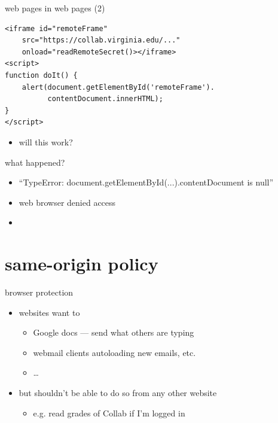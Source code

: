 \begin{frame}[fragile,label=webInWebOther]{web pages in web pages (2)}
    \vspace{-.25cm}
    \setlength{\parskip}{-0.5\baselineskip}
\begin{verbatim}
<iframe id="remoteFrame"
    src="https://collab.virginia.edu/..."
    onload="readRemoteSecret()></iframe>
<script>
function doIt() {
    alert(document.getElementById('remoteFrame').
          contentDocument.innerHTML);
}
</script>
\end{verbatim}
    \begin{itemize}
    \vspace{-.25cm}
    \item will this work?
    \end{itemize}
\end{frame}

\begin{frame}{what happened?}
    \begin{itemize}
        \item ``TypeError: document.getElementById(...).contentDocument is null''
        \item web browser denied access
        \vspace{.5cm}
    \item {}
    \end{itemize}
\end{frame}


\section{same-origin policy}

\begin{frame}{browser protection}
    \begin{itemize}
        \item websites want to 
    \begin{itemize}
        \item Google docs --- send what others are typing
        \item webmail clients autoloading new emails, etc.
        \item \ldots
    \end{itemize}
    \item but shouldn't be able to do so from any other website
        \begin{itemize}
        \item e.g. read grades of Collab if I'm logged in
        \end{itemize}
    \end{itemize}
\end{frame}

